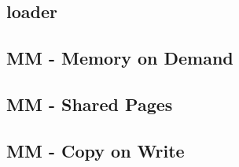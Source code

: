 \documentclass[a4paper]{article}
\begin{document}
\subsection{loader}

\subsection{MM - Memory on Demand}

\subsection{MM - Shared Pages}

\subsection{MM - Copy on Write}
\end{document}
